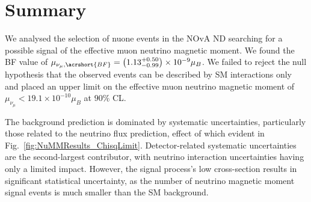 
\section{Summary}\label{sec:NuMMConclusion}

We analysed the selection of \gls{nuone} events in the \gls{NOvA} \gls{ND} searching for a possible signal of the effective muon neutrino magnetic moment. We found the \gls{BF} value of $\mu_{\nu_\mu,\acrshort{BF}}=\left(1.13^{+0.50}_{-0.99}\right)\times 10^{-9}\mu_B$. We failed to reject the null hypothesis that the observed events can be described by \gls{SM} interactions only and placed an upper limit on the effective muon neutrino magnetic moment of $\mu_{\nu_\mu}<19.1\times10^{-10}\mu_B$ at $90\%$ \gls{CL}.

The background prediction is dominated by systematic uncertainties, particularly those related to the neutrino flux prediction, effect of which evident in Fig.~\ref{fig:NuMMResults_ChisqLimit}. Detector-related systematic uncertainties are the second-largest contributor, with neutrino interaction uncertainties having only a limited impact. However, the signal process’s low cross-section results in significant statistical uncertainty, as the number of neutrino magnetic moment signal events is much smaller than the \gls{SM} background.

